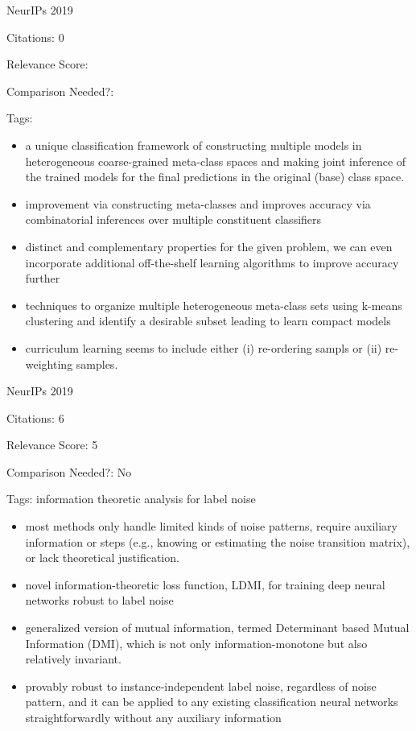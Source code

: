 \documentclass[11pt]{article}
\begin{document}
\vspace{2cm}

\noindent NeurIPs 2019

\noindent Citations: 0

\noindent Relevance Score:

\noindent Comparison Needed?: 

\noindent Tags:

\begin{itemize}
  \item a unique classification framework of constructing multiple models in heterogeneous coarse-grained meta-class spaces and making joint inference of the trained models for the final predictions in the original (base) class space.
  \item improvement via constructing meta-classes and improves accuracy via combinatorial inferences over multiple constituent classifiers
  \item distinct and complementary properties for the given problem, we can even incorporate additional off-the-shelf learning algorithms to improve accuracy further
  \item techniques to organize multiple heterogeneous meta-class sets using k-means clustering and identify a desirable subset leading to learn compact models
  \item curriculum learning seems to include either (i) re-ordering sampls or (ii) re-weighting samples.
\end{itemize}

\vspace{2cm}

\noindent NeurIPs 2019

\noindent Citations: 6

\noindent Relevance Score: 5

\noindent Comparison Needed?: No

\noindent Tags: information theoretic analysis for label noise

\begin{itemize}
  \item most methods only handle limited kinds of noise patterns, require auxiliary information or steps (e.g., knowing or estimating the noise transition matrix), or lack theoretical justification. 
  \item novel information-theoretic loss function, LDMI, for training deep neural networks robust to label noise
  \item generalized version of mutual information, termed Determinant based Mutual Information (DMI), which is not only information-monotone but also relatively invariant.
  \item provably robust to instance-independent label noise, regardless of noise pattern, and it can be applied to any existing classification neural networks straightforwardly without any auxiliary information
\end{itemize}
\end{document}
